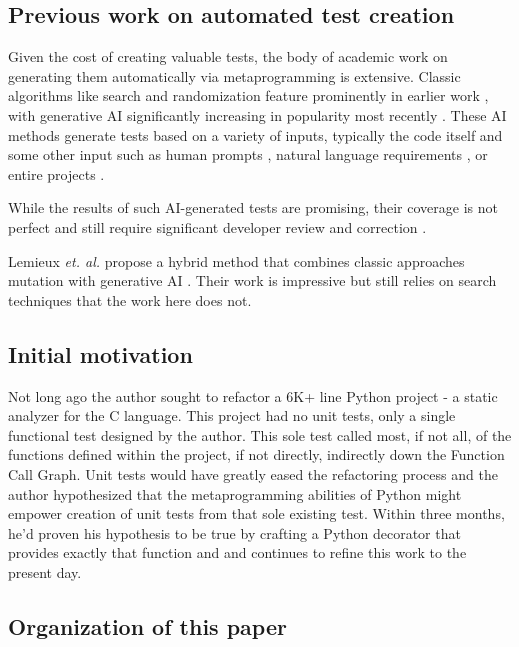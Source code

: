 \subsection{Previous work on automated test creation}\label{sec:intro-3}

Given the cost of creating valuable tests,
the body of academic work on generating them automatically 
via metaprogramming is extensive. Classic algorithms like search 
and randomization feature prominently in earlier work 
\cite{Luk22Pynguin0170}, with generative AI significantly increasing in 
popularity most recently
\cite{bhatia2023unit,takerngsaksiri2024tdd,wang2024software, kahur2023java}.
%
These AI methods generate tests based on a variety of inputs, typically the code
itself and some other input such as human prompts 
\cite{lahiri2023interactivecodegenerationtestdriven},
natural language requirements \cite{wang2024software}, or entire projects
\cite{rao2023cat}.  

While the results of such AI-generated tests are promising,
their coverage is not perfect \cite{kahur2023java} and still require significant
developer review and correction \cite{sundqvist2024ai}.  

Lemieux \textit{et. al.} propose a hybrid method that combines classic approaches
mutation with generative AI \cite{lemieux2023codamosa}.  Their work is 
impressive but still relies on search techniques that the work here does not.  

\subsection{Initial motivation}\label{sec:intro-4}

Not long ago the author sought to refactor a 6K+ line Python project - a static
analyzer for the C language. This project had no unit tests, 
only a single functional test designed by the author.
This sole test called most, if not all, of the functions defined within the 
project, if not directly, indirectly down the Function Call Graph.
Unit tests would have greatly eased the refactoring process and the author 
hypothesized that the metaprogramming abilities of Python might empower creation
of unit tests from that sole existing test. Within three months, he'd proven 
his hypothesis to be true by crafting a Python decorator that provides exactly
that function and and continues to refine this work to the present day.

\subsection{Organization of this paper}\label{sec:intro-5}

